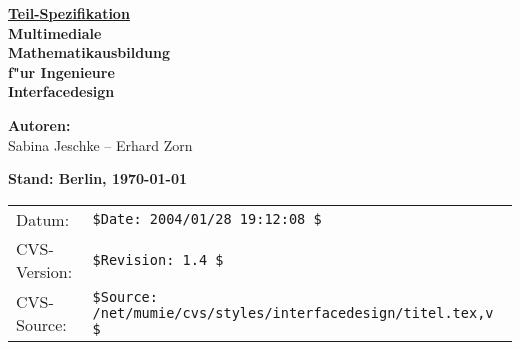 
\pagestyle{empty}

\phantom{a}
\vspace{30mm}

\begin{center}
\underline{\underline{\Huge\bf Teil-Spezifikation}}\\[15mm]
{\Large\bf Multimediale}\\[2ex]
{\Large\bf Mathematikausbildung}\\[2ex]
{\Large\bf f"ur Ingenieure}\\[14ex]
{\Large\bf Interfacedesign}
\item \end{center}

\vspace{22mm}

\begin{center}
{\large \textbf{Autoren:}}\\[2.5ex] 
{\large Sabina Jeschke -- Erhard Zorn}
\end{center}


\vspace{10mm}

\begin{center}
{\large\bf Stand: Berlin, \today}
\end{center}

\vspace{5mm}

\begin{tabular}{ll}
\textsf{Datum:}&\verb+$Date: 2004/01/28 19:12:08 $+\\ %
\textsf{CVS-Version:}&\verb+$Revision: 1.4 $+\\ %
\textsf{CVS-Source:}&\verb+$Source: /net/mumie/cvs/styles/interfacedesign/titel.tex,v $+\\ %
\end{tabular}

\newpage

\phantom{was auch immer...}

\setcounter{page}{0}

\clearpage

\pagestyle{plain}




